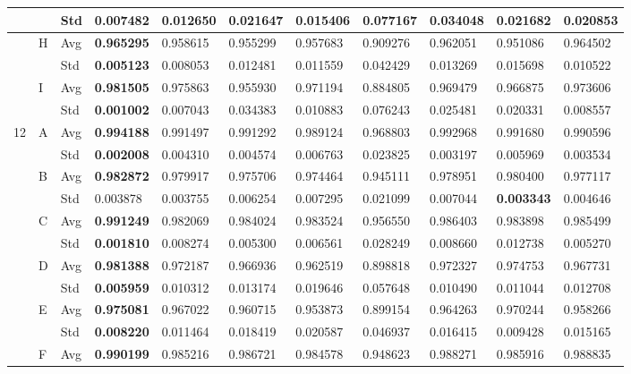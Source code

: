 \documentclass{article} %
\begin{document}
\begin{tabular}{|p{0.5in}|p{0.3in}|p{0.3in}|p{0.5in}|p{0.6in}|p{0.5in}|p{0.5in}|p{0.5in}|p{0.5in}|p{0.5in}|p{0.5in}|}
 &  & Std & \textbf{0.007482 } & 0.012650  & 0.021647  & 0.015406  & 0.077167  & 0.034048  & 0.021682  & 0.020853  \\ \hline 
 & H & Avg & \textbf{0.965295 } & 0.958615  & 0.955299  & 0.957683  & 0.909276  & 0.962051  & 0.951086  & 0.964502  \\ \hline 
 &  & Std & \textbf{0.005123 } & 0.008053  & 0.012481  & 0.011559  & 0.042429  & 0.013269  & 0.015698  & 0.010522  \\ \hline 
 & I & Avg & \textbf{0.981505 } & 0.975863  & 0.955930  & 0.971194  & 0.884805  & 0.969479  & 0.966875  & 0.973606  \\ \hline 
 &  & Std & \textbf{0.001002 } & 0.007043  & 0.034383  & 0.010883  & 0.076243  & 0.025481  & 0.020331  & 0.008557  \\ \hline 
12 & A & Avg & \textbf{0.994188 } & 0.991497  & 0.991292  & 0.989124  & 0.968803  & 0.992968  & 0.991680  & 0.990596  \\ \hline 
 &  & Std & \textbf{0.002008 } & 0.004310  & 0.004574  & 0.006763  & 0.023825  & 0.003197  & 0.005969  & 0.003534  \\ \hline 
 & B & Avg & \textbf{0.982872 } & 0.979917  & 0.975706  & 0.974464  & 0.945111  & 0.978951  & 0.980400  & 0.977117  \\ \hline 
 &  & Std & 0.003878  & 0.003755  & 0.006254  & 0.007295  & 0.021099  & 0.007044  & \textbf{0.003343 } & 0.004646  \\ \hline 
 & C & Avg & \textbf{0.991249 } & 0.982069  & 0.984024  & 0.983524  & 0.956550  & 0.986403  & 0.983898  & 0.985499  \\ \hline 
 &  & Std & \textbf{0.001810 } & 0.008274  & 0.005300  & 0.006561  & 0.028249  & 0.008660  & 0.012738  & 0.005270  \\ \hline 
 & D & Avg & \textbf{0.981388 } & 0.972187  & 0.966936  & 0.962519  & 0.898818  & 0.972327  & 0.974753  & 0.967731  \\ \hline 
 &  & Std & \textbf{0.005959 } & 0.010312  & 0.013174  & 0.019646  & 0.057648  & 0.010490  & 0.011044  & 0.012708  \\ \hline 
 & E & Avg & \textbf{0.975081 } & 0.967022  & 0.960715  & 0.953873  & 0.899154  & 0.964263  & 0.970244  & 0.958266  \\ \hline 
 &  & Std & \textbf{0.008220 } & 0.011464  & 0.018419  & 0.020587  & 0.046937  & 0.016415  & 0.009428  & 0.015165  \\ \hline 
 & F & Avg & \textbf{0.990199 } & 0.985216  & 0.986721  & 0.984578  & 0.948623  & 0.988271  & 0.985916  & 0.988835  \\ \hline 

\end{tabular}
\end{document}
